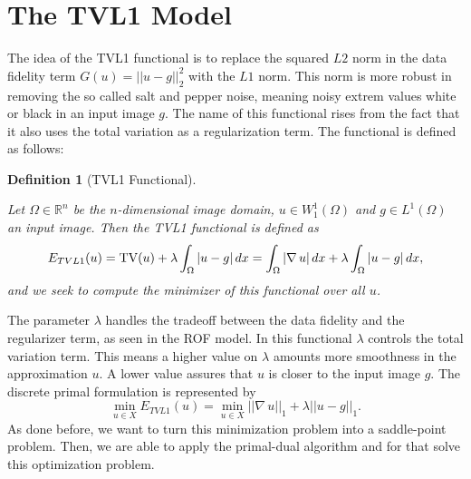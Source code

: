 \documentclass[abstracton]{scrreprt}
\newtheorem{definition}[theorem]{Definition}
\begin{document}


    \section{The TVL1 Model} %
    \label{sec:the_tvl1_model}
        
        The idea of the TVL1 functional is to replace the squared $L2$ norm in the data fidelity term $G(u) = ||u - g||_{2}^{2}$ with the $L1$ norm. This norm is more robust in removing the so called salt and pepper noise, meaning noisy extrem values white or black in an input image $g$. The name of this functional rises from the fact that it also uses the total variation as a regularization term. The functional is defined as follows:
        \begin{definition}[TVL1 Functional] %
        \label{def:tvl1_functional}

            Let $\Omega \in \mathbb{R}^{n}$ be the $n$-dimensional image domain, $u \in W_{1}^{1}(\Omega)$ and $g \in L^{1}(\Omega)$ an input image. Then the TVL1 functional is defined as
                \begin{equation}
                    E_{TVL1}(u) = \textnormal{TV}(u) + \lambda \int_{\Omega} |u - g| \, dx = \int_{\Omega} |\nabla \, u| \, dx + \lambda \int_{\Omega} |u - g| \, dx,
                \end{equation}
            and we seek to compute the minimizer of this functional over all $u$.

        \end{definition}
        The parameter $\lambda$ handles the tradeoff between the data fidelity and the regularizer term, as seen in the ROF model. In this functional $\lambda$ controls the total variation term. This means a higher value on $\lambda$ amounts more smoothness in the approximation $u$. A lower value assures that $u$ is closer to the input image $g$. The discrete primal formulation is represented by
            \begin{equation}
                \min_{u \in X} E_{TVL1}(u) = \min_{u \in X} ||\nabla \, u||_{1} + \lambda ||u - g||_{1}.
                \label{eq:primal_formulation_tvl1}
            \end{equation}
        As done before, we want to turn this minimization problem into a saddle-point problem. Then, we are able to apply the primal-dual algorithm and for that solve this optimization problem.
\end{document}

